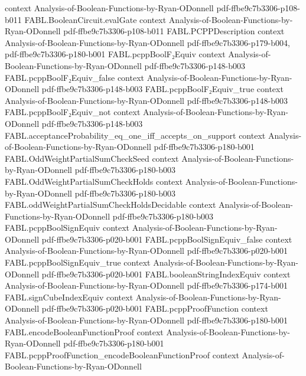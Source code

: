\begin{theorem}
  {context}
  {Analysis-of-Boolean-Functions-by-Ryan-ODonnell}
  {pdf-ffbe9c7b3306-p108-b011}
\proofstep
  {FABL.BooleanCircuit.evalGate}
  {context}
  {Analysis-of-Boolean-Functions-by-Ryan-ODonnell}
  {pdf-ffbe9c7b3306-p108-b011}
\proofstep
  {FABL.PCPPDescription}
  {context}
  {Analysis-of-Boolean-Functions-by-Ryan-ODonnell}
  {pdf-ffbe9c7b3306-p179-b004,
    pdf-ffbe9c7b3306-p180-b001}
\proofstep
  {FABL.pcppBoolF₂Equiv}
  {context}
  {Analysis-of-Boolean-Functions-by-Ryan-ODonnell}
  {pdf-ffbe9c7b3306-p148-b003}
\proofstep
  {FABL.pcppBoolF₂Equiv_false}
  {context}
  {Analysis-of-Boolean-Functions-by-Ryan-ODonnell}
  {pdf-ffbe9c7b3306-p148-b003}
\proofstep
  {FABL.pcppBoolF₂Equiv_true}
  {context}
  {Analysis-of-Boolean-Functions-by-Ryan-ODonnell}
  {pdf-ffbe9c7b3306-p148-b003}
\proofstep
  {FABL.pcppBoolF₂Equiv_not}
  {context}
  {Analysis-of-Boolean-Functions-by-Ryan-ODonnell}
  {pdf-ffbe9c7b3306-p148-b003}
\proofstep
  {FABL.acceptanceProbability_eq_one_iff_accepts_on_support}
  {context}
  {Analysis-of-Boolean-Functions-by-Ryan-ODonnell}
  {pdf-ffbe9c7b3306-p180-b001}
\proofstep
  {FABL.OddWeightPartialSumCheckSeed}
  {context}
  {Analysis-of-Boolean-Functions-by-Ryan-ODonnell}
  {pdf-ffbe9c7b3306-p180-b003}
\proofstep
  {FABL.OddWeightPartialSumCheckHolds}
  {context}
  {Analysis-of-Boolean-Functions-by-Ryan-ODonnell}
  {pdf-ffbe9c7b3306-p180-b003}
\proofstep
  {FABL.oddWeightPartialSumCheckHoldsDecidable}
  {context}
  {Analysis-of-Boolean-Functions-by-Ryan-ODonnell}
  {pdf-ffbe9c7b3306-p180-b003}
\proofstep
  {FABL.pcppBoolSignEquiv}
  {context}
  {Analysis-of-Boolean-Functions-by-Ryan-ODonnell}
  {pdf-ffbe9c7b3306-p020-b001}
\proofstep
  {FABL.pcppBoolSignEquiv_false}
  {context}
  {Analysis-of-Boolean-Functions-by-Ryan-ODonnell}
  {pdf-ffbe9c7b3306-p020-b001}
\proofstep
  {FABL.pcppBoolSignEquiv_true}
  {context}
  {Analysis-of-Boolean-Functions-by-Ryan-ODonnell}
  {pdf-ffbe9c7b3306-p020-b001}
\proofstep
  {FABL.booleanStringIndexEquiv}
  {context}
  {Analysis-of-Boolean-Functions-by-Ryan-ODonnell}
  {pdf-ffbe9c7b3306-p174-b001}
\proofstep
  {FABL.signCubeIndexEquiv}
  {context}
  {Analysis-of-Boolean-Functions-by-Ryan-ODonnell}
  {pdf-ffbe9c7b3306-p020-b001}
\proofstep
  {FABL.pcppProofFunction}
  {context}
  {Analysis-of-Boolean-Functions-by-Ryan-ODonnell}
  {pdf-ffbe9c7b3306-p180-b001}
\proofstep
  {FABL.encodeBooleanFunctionProof}
  {context}
  {Analysis-of-Boolean-Functions-by-Ryan-ODonnell}
  {pdf-ffbe9c7b3306-p180-b001}
\proofstep
  {FABL.pcppProofFunction_encodeBooleanFunctionProof}
  {context}
  {Analysis-of-Boolean-Functions-by-Ryan-ODonnell}

\end{theorem}
